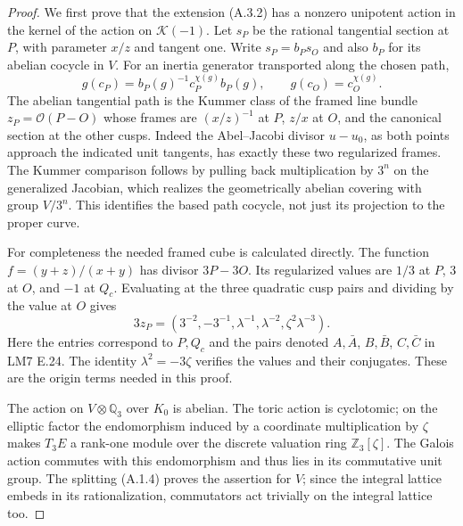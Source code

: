 \begin{proof}
We first prove that the extension (A.3.2) has a nonzero unipotent
action in the kernel of the action on $\mathcal K(-1)$. Let $s_P$
be the rational tangential section at $P$, with parameter $x/z$
and tangent one. Write $s_P=b_Ps_O$ and also $b_P$ for its abelian
cocycle in $V$. For an inertia generator transported along the
chosen path,
\[
 g(c_P)=b_P(g)^{-1}c_P^{\chi(g)}b_P(g),\qquad
 g(c_O)=c_O^{\chi(g)}.
 \tag{A.4.1}
\]
The abelian tangential path is the Kummer class of the framed line
bundle $z_P=\mathcal O(P-O)$ whose frames are $(x/z)^{-1}$ at $P$,
$z/x$ at $O$, and the canonical section at the other cusps.
Indeed the Abel--Jacobi divisor $u-u_0$, as both points approach
the indicated unit tangents, has exactly these two regularized
frames. The Kummer comparison follows by pulling back multiplication
by $3^n$ on the generalized Jacobian, which realizes the
geometrically abelian covering with group $V/3^n$. This identifies
the based path cocycle, not just its projection to the proper curve.

For completeness the needed framed cube is calculated directly.
The function $f=(y+z)/(x+y)$ has divisor $3P-3O$.
Its regularized values are $1/3$ at $P$, $3$ at $O$, and $-1$ at
$Q_c$. Evaluating at the three quadratic cusp pairs and dividing
by the value at $O$ gives
\[
 3z_P=(3^{-2},-3^{-1},\lambda^{-1},\lambda^{-2},
                    \zeta^2\lambda^{-3}).
 \tag{A.4.2}
\]
Here the entries correspond to $P,Q_c$ and the pairs denoted
$A,\bar A$, $B,\bar B$, $C,\bar C$ in LM7 E.24.
The identity $\lambda^2=-3\zeta$ verifies the values and their
conjugates. These are the origin terms needed in this proof.

The action on $V\otimes\mathbb Q_3$ over $K_0$ is abelian.
The toric action is cyclotomic; on the elliptic factor the
endomorphism induced by a coordinate multiplication by $\zeta$
makes $T_3E$ a rank-one module over the discrete valuation ring
$\mathbb Z_3[\zeta]$. The Galois action commutes with this
endomorphism and thus lies in its commutative unit group.
The splitting (A.1.4) proves the assertion for $V$; since the
integral lattice embeds in its rationalization, commutators act
trivially on the integral lattice too.


\end{proof}
